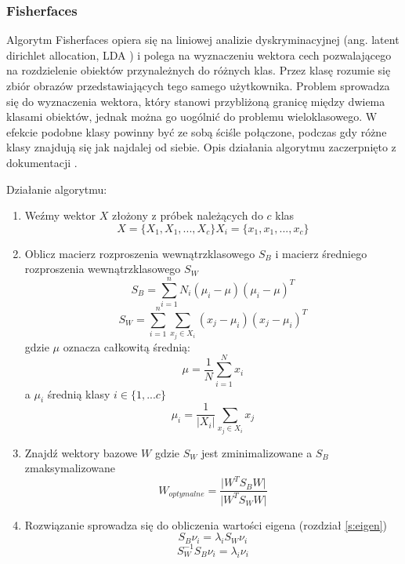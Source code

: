 \subsubsection{Fisherfaces} \label{fisher}
Algorytm Fisherfaces \cite{opencv_doc} opiera się na liniowej analizie dyskryminacyjnej (ang. latent dirichlet allocation, LDA \cite{pca_lda}) i polega na wyznaczeniu wektora cech pozwalającego na rozdzielenie obiektów przynależnych do różnych klas. Przez klasę rozumie się zbiór obrazów przedstawiających tego samego użytkownika. Problem sprowadza się do wyznaczenia wektora, który stanowi przybliżoną granicę między dwiema klasami obiektów, jednak można go uogólnić do problemu wieloklasowego. W efekcie podobne klasy powinny być ze sobą ściśle połączone, podczas gdy różne klasy znajdują się jak najdalej od siebie. Opis działania algorytmu zaczerpnięto z dokumentacji \cite{opencv_ref}.

Działanie algorytmu:
\begin{enumerate}
\item Weźmy wektor $X$ złożony z próbek należących do $c$ klas
\begin{equation}
X=\{X_{1},X_{1},...,X_{c}\}
X_{i}=\{x_{1},x_{1},...,x_{c}\}
\end{equation}
\item Oblicz macierz rozproszenia wewnątrzklasowego $S_{B}$ i macierz średniego rozproszenia wewnątrzklasowego $S_{W}$
\begin{equation}
S_{B}=\sum_{i=1}^{n}N_{i}(\mu_{i}-\mu)(\mu_{i}-\mu)^{T}
\end{equation}
\begin{equation}
S_{W}=\sum_{i=1}^{n}\sum_{x_{j}\in X_{i}}(x_{j}-\mu_{i})(x_{j}-\mu_{i})^{T}
\end{equation}
gdzie $\mu$ oznacza całkowitą średnią:
\begin{equation}
\mu=\frac{1}{N}\sum_{i=1}^{N}x_{i}
\end{equation}
a $\mu_{i}$ średnią klasy $i\in \{1,...c\}$
\begin{equation}
\mu_{i}=\frac{1}{|X_{i}|}\sum_{x_{j}\in X_{i}}x_{j}
\end{equation}
\item Znajdź wektory bazowe $W$ gdzie $S_{W}$ jest zminimalizowane a $S_{B}$ zmaksymalizowane
\begin{equation}
W_{optymalne}=\frac{\vert W^{T}S_{B}W\vert }{\vert W^{T}S_{W}W\vert }
\end{equation}
\item Rozwiązanie sprowadza się do obliczenia wartości eigena (rozdział \ref{s:eigen})
\begin{equation}
S_{B}\nu_{i}=\lambda_{i}S_{W}\nu_{i}
\end{equation}
\begin{equation}
S_{W}^{-1}S_{B}\nu_{i}=\lambda_{i}\nu_{i}
\end{equation}
\end{enumerate}

